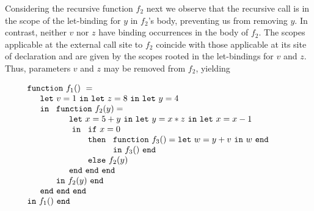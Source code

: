 Considering the recursive function $f_2$ next we observe that the
recursive call is in the scope of the let-binding for $y$ in $f_2$'s
body, preventing us from removing $y$.  In contrast, neither $v$ nor
$z$ have binding occurrences in the body of $f_2$. The scopes
applicable at the external call site to $f_2$ coincide with those
applicable at its site of declaration and are given by the scopes
rooted in the let-bindings for $v$ and $z$. Thus, parameters $v$ and
$z$ may be removed from $f_2$, yielding

\begin{equation}
\label{FunctionalConstructionProgram6}
\begin{array}{l}
\mathtt{function}\ f_1()\ = \\
  \quad
  \begin{array}{l}
     \mathtt{let}\ v = 1 \ 
     \mathtt{in\ let}\ z = 8 \ 
     \mathtt{in\ let}\ y = 4\\
     \mathtt{in}\ 
     \begin{array}[t]{l}
       \mathtt{function}\ f_2(y) =\\
         \quad
         \begin{array}{l}
           \mathtt{let}\ x = 5+y\
           \mathtt{in\ let}\ y = x*z\
           \mathtt{in\ let}\ x = x-1\\\
           \mathtt{in}\
           \begin{array}[t]{l}
             \mathtt{if}\ x=0\\ 
             \mathtt{then}\ 
               \begin{array}[t]{l}
                 \mathtt{function}\ f_3() = 
                 \mathtt{let}\ w = y+v\ \mathtt{in}\ w\ \mathtt{end}\\
                 \mathtt{in}\ f_3()\ \mathtt{end}
               \end{array}\\
             \mathtt{else}\ f_2(y)
           \end{array}\\
           \mathtt{end\ end\ end}
         \end{array}\\
     \mathtt{in}\ f_2(y)\ \mathtt{end}
     \end{array}\\
     \mathtt{end\ end\ end}\\
   \end{array}\\
\mathtt{in}\ f_1()\  \mathtt{end}
\end{array}
\end{equation}
